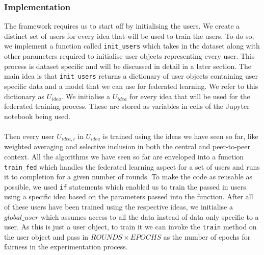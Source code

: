 \documentclass[12pt]{article}
\begin{document}
\subsubsection{Implementation}
The framework requires us to start off by initialising the users. We create a distinct set of users for every idea that will be used to train the users. To do so, we implement a function called \texttt{init\_users} which takes in the dataset along with other parameters required to initialise user objects representing every user. This process is dataset specific and will be discussed in detail in a later section. The main idea is that \texttt{init\_users} returns a dictionary of user objects containing user specific data and a model that we can use for federated learning. We refer to this dictionary as $U_{idea}$. We initialise a $U_{idea}$ for every idea that will be used for the federated training process. These are stored as variables in cells of the Jupyter notebook being used.
\\\\
Then every user $U_{idea,i}$ in $U_{idea}$ is trained using the ideas we have seen so far, like weighted averaging and selective inclusion in both the central and peer-to-peer context. All the algorithms we have seen so far are enveloped into a function \texttt{train\_fed} which handles the federated learning aspect for a set of users and runs it to completion for a given number of rounds. To make the code as reusable as possible, we used \texttt{if} statements which enabled us to train the passed in users using a specific idea based on the parameters passed into the function. After all of these users have been trained using the respective ideas, we initialise a $global\_user$ which assumes access to all the data instead of data only specific to a user. As this is just a user object, to train it we can invoke the \texttt{train} method on the user object and pass in $ROUNDS \times EPOCHS$ as the number of epochs for fairness in the experimentation process.
\\\\
\end{document}
